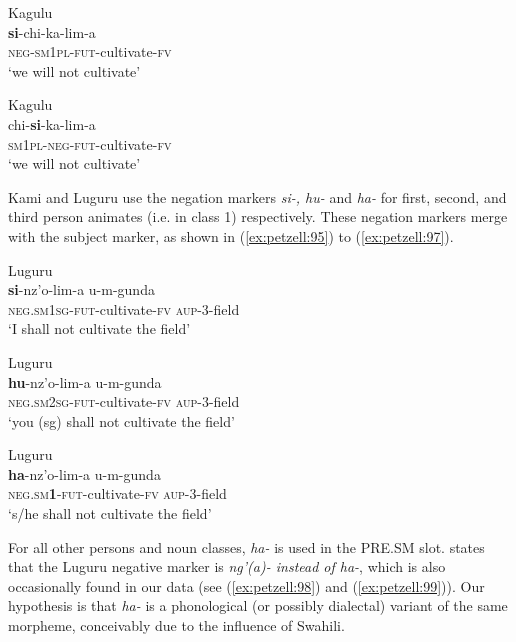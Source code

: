 \documentclass[output=paper,
            colorlinks, citecolor=brown
            ,draftmode
		  ]{langscibook}
\begin{document}
\ea\label{ex:petzell:93}Kagulu\\
\gll \textbf{si}{}-chi-ka-lim-a\\
\textsc{{neg}}{}-\textsc{sm}1\textsc{pl}{}-\textsc{fut}{}-cultivate-\textsc{fv}\\
\glt `we will not cultivate'


\ex\label{ex:petzell:94}Kagulu\\
\gll chi-\textbf{si}{}-ka-lim-a \\
\textsc{sm}1\textsc{pl}{}-\textsc{{neg}}{}-\textsc{fut}{}-cultivate-\textsc{fv}\\
\glt `we will not cultivate'
\z


Kami and Luguru use the negation markers \textit{si-, hu-} and \textit{ha-} for first, second, and third person animates (i.e. in class 1) respectively. These negation markers merge with the subject marker, as shown in  (\ref{ex:petzell:95}) to (\ref{ex:petzell:97}).


\ea\label{ex:petzell:95}Luguru\\
\gll \textbf{si}{}-nz'o\footnotemark{}-lim-a                 u-m-gunda  \\
\textsc{{neg.sm1sg}}{}-\textsc{fut}{}-cultivate-\textsc{fv}      \textsc{aup}{}-3-field\\
\glt `I shall not cultivate the field'


\ex\label{ex:petzell:96} Luguru\\
\gll \textbf{hu}{}-nz'o-lim-a                 u-m-gunda \\
\textsc{{neg}}.\textsc{{sm}}{2}\textsc{{sg}}{}-\textsc{fut}{}-cultivate-\textsc{fv}      \textsc{aup}{}-3-field\\
\glt `you (sg) shall not cultivate the field'


\ex\label{ex:petzell:97}Luguru\\
\gll \textbf{ha}{}-nz'o-lim-a                 u-m-gunda \\
\textsc{{neg}}.\textsc{{sm}}\textbf{1}{}-\textsc{fut}{}-cultivate-\textsc{fv}        \textsc{aup}{}-3-field\\
\glt `s/he shall not cultivate the field'
\z
{}

For all other persons and noun classes, \textit{ha-} is used in the PRE.SM slot. \citet[100]{Mkude1974} states that the Luguru negative marker is \textit{ng'(a)- instead of ha-}, which is also occasionally found in our data (see  (\ref{ex:petzell:98}) and (\ref{ex:petzell:99})). Our hypothesis is that \textit{ha-} is a phonological (or possibly dialectal) variant of the same morpheme, conceivably due to the influence of Swahili.
\end{document}
